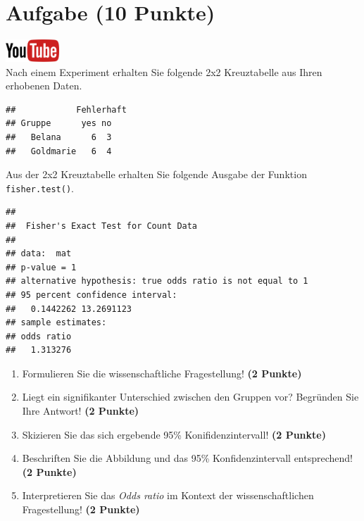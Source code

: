 \documentclass[a4paper, 10pt]{scrartcl}\usepackage[]{graphicx}\usepackage[]{xcolor}
\makeatletter
\newenvironment{kframe}{%
 \def\at@end@of@kframe{}%
 \ifinner\ifhmode%
  \def\at@end@of@kframe{\end{minipage}}%
  \begin{minipage}{\columnwidth}%
 \fi\fi%
 \def\FrameCommand##1{\hskip\@totalleftmargin \hskip-\fboxsep
 \colorbox{shadecolor}{##1}\hskip-\fboxsep
     \hskip-\linewidth \hskip-\@totalleftmargin \hskip\columnwidth}%
 \MakeFramed {\advance\hsize-\width
   \@totalleftmargin\z@ \linewidth\hsize
   \@setminipage}}%
 {\par\unskip\endMakeFramed%
 \at@end@of@kframe}
\newenvironment{knitrout}{}{} %
\makeatother
\begin{document}
\section{Aufgabe \hfill (10 Punkte)}

\hfill\href{https://youtu.be/ghArbetOr_E}{\includegraphics[width =
  2cm]{img/youtube}}\\[1Ex]

Nach einem Experiment erhalten Sie folgende 2x2 Kreuztabelle aus Ihren
erhobenen Daten.

\begin{knitrout}
\color{fgcolor}\begin{kframe}
\begin{verbatim}
##            Fehlerhaft
## Gruppe      yes no
##   Belana      6  3
##   Goldmarie   6  4
\end{verbatim}
\end{kframe}
\end{knitrout}

Aus der 2x2 Kreuztabelle erhalten Sie folgende \Rlogo Ausgabe der Funktion
\texttt{fisher.test()}.

\begin{knitrout}
\color{fgcolor}\begin{kframe}
\begin{verbatim}
## 
## 	Fisher's Exact Test for Count Data
## 
## data:  mat
## p-value = 1
## alternative hypothesis: true odds ratio is not equal to 1
## 95 percent confidence interval:
##   0.1442262 13.2691123
## sample estimates:
## odds ratio 
##   1.313276
\end{verbatim}
\end{kframe}
\end{knitrout}


\begin{enumerate}
\item Formulieren Sie die wissenschaftliche Fragestellung! \textbf{(2 Punkte)}
\item Liegt ein signifikanter Unterschied zwischen den Gruppen vor?
  Begr{\"u}nden Sie Ihre Antwort! \textbf{(2 Punkte)}
\item Skizieren Sie das sich ergebende 95\% Konifidenzintervall! \textbf{(2 Punkte)}
\item Beschriften Sie die Abbildung und
  das 95\% Konfidenzintervall entsprechend! \textbf{(2 Punkte)} 
\item Interpretieren Sie das \textit{Odds ratio} im Kontext der
  wissenschaftlichen Fragestellung! \textbf{(2 Punkte)} 
\end{enumerate}
 
\end{document}
